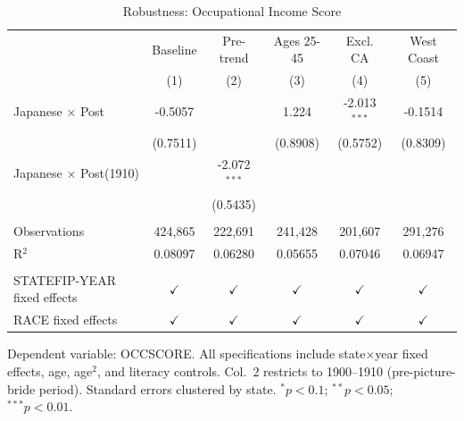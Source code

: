 \begin{table}[htbp]
   \caption{\label{tab:robustness} Robustness: Occupational Income Score}
   \bigskip
   \centering
   \small
   \begin{tabular}{lccccc}
      \toprule
                                    & Baseline      & Pre-trend      & Ages 25-45    & Excl. CA       & West Coast \\   
                                    & (1)           & (2)            & (3)           & (4)            & (5)\\  
      \midrule 
      Japanese $\times$ Post        & -0.5057       &                & 1.224         & -2.013$^{***}$ & -0.1514\\   
                                    & (0.7511)      &                & (0.8908)      & (0.5752)       & (0.8309)\\   
      Japanese $\times$ Post(1910)  &               & -2.072$^{***}$ &               &                &   \\   
                                    &               & (0.5435)       &               &                &   \\   
       \\
      Observations                  & 424,865       & 222,691        & 241,428       & 201,607        & 291,276\\  
      R$^2$                         & 0.08097       & 0.06280        & 0.05655       & 0.07046        & 0.06947\\  
       \\
      STATEFIP-YEAR fixed effects   & $\checkmark$  & $\checkmark$   & $\checkmark$  & $\checkmark$   & $\checkmark$\\   
      RACE fixed effects            & $\checkmark$  & $\checkmark$   & $\checkmark$  & $\checkmark$   & $\checkmark$\\   
      \bottomrule
   \end{tabular}
   
   \par \raggedright 
   Dependent variable: OCCSCORE. All specifications include state$\times$year fixed effects, age, age$^2$, and literacy controls. Col.~2 restricts to 1900--1910 (pre-picture-bride period). Standard errors clustered by state. $^{*}p<0.1$; $^{**}p<0.05$; $^{***}p<0.01$.
\end{table}
